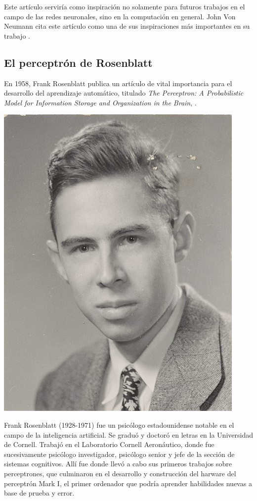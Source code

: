 \documentclass[11pt,twoside,titlepage,a4paper]{article}
\numberwithin{equation}{section} %
\theoremstyle{usual}
\begin{document}
Este artículo serviría como inspiración no solamente para futuros trabajos en el campo de las redes neuronales, sino en la computación en general. John Von Neumann cita este artículo como una de sus inspiraciones más importantes en su trabajo \cite{skansi}. \\

\subsection{El perceptrón de Rosenblatt}
    En 1958, Frank Rosenblatt publica un artículo de vital importancia para el desarrollo del aprendizaje automático, titulado \textit{The Perceptron: A Probabilistic Model for Information Storage and Organization in the Brain}, \cite{rosenblatt}.
    
    \begin{marginfigure}
       \includegraphics[width=\marginparwidth]{Source/images/rosenblatt.jpg}
        \caption{Frank Rosenblatt (1928-1971) fue un psicólogo estadounidense notable en el campo de la inteligencia artificial. Se graduó y doctoró en letras en la Universidad de Cornell. Trabajó en el Laboratorio Cornell Aeronáutico, donde fue sucesivamente psicólogo investigador, psicólogo senior y jefe de la sección de sistemas cognitivos. Allí fue donde llevó a cabo sus primeros trabajos sobre perceptrones, que culminaron en el desarrollo y construcción del harware del perceptrón Mark I, el primer ordenador que podría aprender habilidades nuevas a base de prueba y error.}
    \end{marginfigure}
    
\end{document}
